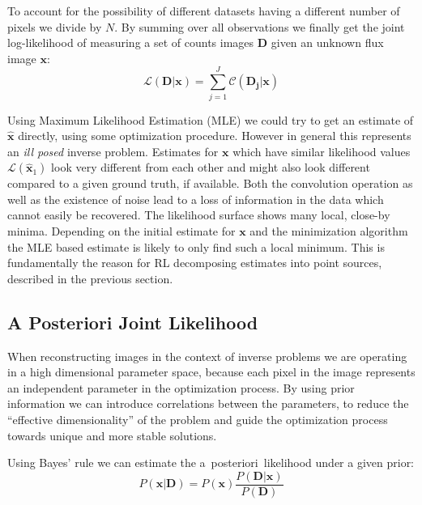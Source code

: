 \documentclass[twocolumn]{aastex631}
\newcommand{\aposteriori}{a~posteriori~}
\begin{document}
    To account for the possibility of different datasets having a different number of pixels we divide by $N$. By summing over all observations we finally get the joint log-likelihood of measuring a set of counts images $\mathbf{D}$ given an unknown flux image $\mathbf{x}$:
    \begin{equation}
        \label{eq:joint}
        \mathcal{L}\left( \mathbf{D} | \mathbf{x} \right) = \sum_{j=1}^J \mathcal{C}\left( \mathbf{D_j} | \mathbf{x} \right)
    \end{equation}

    Using Maximum Likelihood Estimation (MLE) we could try to get an estimate of $\hat{\mathbf{x}}$ directly, using some optimization procedure. However in general this represents an \textit{ill posed} inverse problem. Estimates for $\mathbf{x}$ which have similar likelihood values $\mathcal{L}(\hat{\mathbf{x}}_1)$ look very different from each other and might also look different compared to a given ground truth, if available. Both the convolution operation as well as the existence of noise lead to a loss of information in the data which cannot easily be recovered. The likelihood surface shows many local, close-by minima. Depending on the initial estimate for $\mathbf{x}$ and the minimization algorithm the MLE based estimate is likely to only find such a local minimum. This is fundamentally the reason for RL decomposing estimates into point sources, described in the previous section. 
    
    \subsection{A Posteriori Joint Likelihood}
    When reconstructing images in the context of inverse problems we are operating in a high dimensional parameter space, because each pixel in the image represents an independent parameter in the optimization process. By using prior information we can introduce correlations between the parameters, to reduce the \enquote{effective dimensionality} of the problem and guide the optimization process towards unique and more stable solutions.
    
    Using Bayes' rule we can estimate the \aposteriori likelihood under a given prior:
    \begin{equation}
        \label{eq:bayes}
        P(\mathbf{x}|\textbf{D}) = P(\mathbf{x} ) \frac{P(\textbf{D} |\mathbf{x})}{P(\textbf{D})}
    \end{equation}
\end{document}
